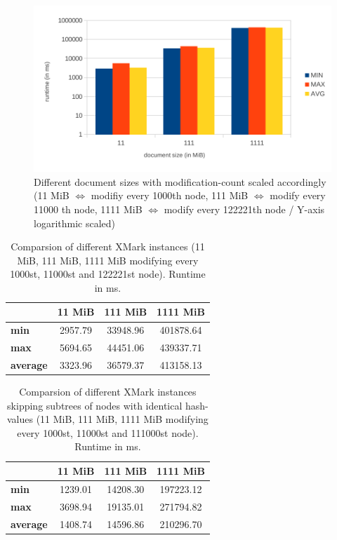 \begin{figure}[tb]
\centering
\includegraphics[width=\textwidth]{figures/diff-docsize-scale}
\caption{Different document sizes with modification-count scaled accordingly (11 MiB $\Leftrightarrow$ modifiy every 1000th node, 111 MiB $\Leftrightarrow$ modify every 11000 th node, 1111 MiB $\Leftrightarrow$ modify every 122221th node / Y-axis logarithmic scaled)} 
\label{fig:docScaling}
\end{figure}

\begin{table}[tb]
\centering 
\begin{tabular}[r]{|l|c|c|c|} 
\hline
& \textbf{11 MiB} & \textbf{111 MiB} & \textbf{1111 MiB}\\
\hline
\hline
\textbf{min} & 2957.79 & 33948.96 & 401878.64\\
\hline
\textbf{max} & 5694.65 & 44451.06 & 439337.71\\
\hline
\textbf{average} & 3323.96 & 36579.37 & 413158.13\\
\hline
\end{tabular}
\label{chap3:compDiffInstances}
\vspace{0.5em} 
\caption{Comparsion of different XMark instances (11 MiB, 111 MiB, 1111 MiB modifying every 1000st, 11000st and 122221st node). Runtime in ms.}
\end{table}

\begin{table}[tb]
\centering 
\begin{tabular}[r]{|l|c|c|c|} 
\hline
& \textbf{11 MiB} & \textbf{111 MiB} & \textbf{1111 MiB}\\
\hline
\hline
\textbf{min} & 1239.01 & 14208.30 & 197223.12\\
\hline
\textbf{max} & 3698.94 & 19135.01 & 271794.82\\
\hline
\textbf{average} & 1408.74 & 14596.86 & 210296.70\\
\hline
\end{tabular}
\label{chap3:compPrunedDiffInstances}
\vspace{0.5em} 
\caption{Comparsion of different XMark instances skipping subtrees of nodes with identical hash-values (11 MiB, 111 MiB, 1111 MiB modifying every 1000st, 11000st and 111000st node). Runtime in ms.}
\end{table}


